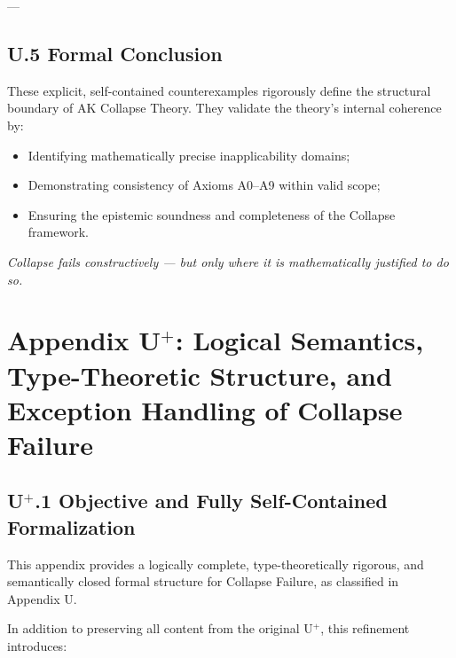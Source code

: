 \documentclass[11pt]{article}
\begin{document}
---

\subsection*{U.5 Formal Conclusion}

These explicit, self-contained counterexamples rigorously define the structural boundary of AK Collapse Theory.  
They validate the theory's internal coherence by:

\begin{itemize}
    \item Identifying mathematically precise inapplicability domains;
    \item Demonstrating consistency of Axioms A0–A9 within valid scope;
    \item Ensuring the epistemic soundness and completeness of the Collapse framework.
\end{itemize}

\begin{center}
\textit{Collapse fails constructively — but only where it is mathematically justified to do so.}
\end{center}




\section*{Appendix U$^{+}$: Logical Semantics, Type-Theoretic Structure, and Exception Handling of Collapse Failure}

\subsection*{U$^{+}$.1 Objective and Fully Self-Contained Formalization}

This appendix provides a logically complete, type-theoretically rigorous, and semantically closed formal structure for Collapse Failure, as classified in Appendix U.

In addition to preserving all content from the original U$^{+}$, this refinement introduces:
\end{document}
